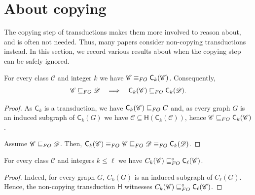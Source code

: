 \documentclass{lmcs}
\newcommand{\Cc}{\mathscr{C}}
\newcommand{\Dd}{\mathscr{D}}
\renewcommand{\FO}{{\rm FO}}
\theoremstyle{definition}
\begin{document}
\section{About copying}

The copying step of transductions makes them more involved to reason about, and is often not needed. Thus, many papers consider non-copying transductions instead. In this section, we record various results about when the copying step can be safely ignored.

\begin{fact}
	\label{fact:copy_equiv}
	For every class $\Cc$ and integer $k$ we have
	$\Cc\equiv_\FO	\mathsf C_k(\Cc)$.
		Consequently,
\[	\Cc\sqsubseteq_\FO\Dd\quad\Longrightarrow\quad \mathsf C_k(\Cc)\sqsubseteq_\FO\mathsf C_k(\Dd).\]
\end{fact}
\begin{proof}
	As $\mathsf C_k$ is a transduction, we have $\mathsf C_k(\Cc)\sqsubseteq_\FO	\mathsf\Cc$ and, as every graph $G$ is an induced subgraph of
	$\mathsf C_k(G)$ we have
	$\Cc\subseteq\mathsf H(\mathsf C_k(\Cc))$, hence $\Cc\sqsubseteq_\FO	\mathsf C_k(\Cc)$.
	
		Assume $\Cc\sqsubseteq_\FO\Dd$.
	Then,  $\mathsf C_k(\Cc)\equiv_\FO\Cc\sqsubseteq_\FO\Dd\equiv_\FO \mathsf C_k(\Dd)$.
\end{proof}

\begin{fact}
	For every class $\Cc$ and integers $k\leq\ell$ we have
	$C_k(\Cc)\sqsubseteq_\FO^\circ	\mathsf C_\ell(\Cc)$.
\end{fact}
\begin{proof}
	Indeed, for every graph $G$, $C_k(G)$ is an induced subgraph of $C_\ell(G)$. Hence, the non-copying transduction $\mathsf H$ witnesses $C_k(\Cc)\sqsubseteq_\FO^\circ	\mathsf C_\ell(\Cc)$.
\end{proof}
\end{document}
